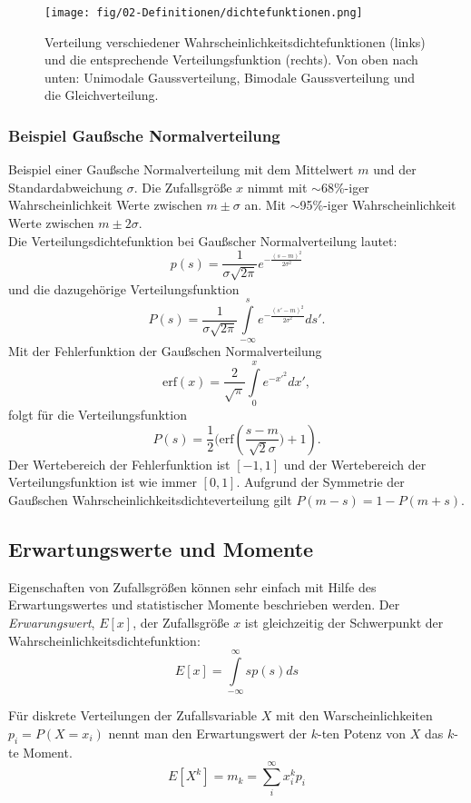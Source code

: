 \begin{figure}
\centering
\texttt{[image: fig/02-Definitionen/dichtefunktionen.png]}
\caption{Verteilung verschiedener Wahrscheinlichkeitsdichtefunktionen (links) und die entsprechende Verteilungsfunktion (rechts). Von oben nach unten: Unimodale Gaussverteilung, Bimodale Gaussverteilung und die Gleichverteilung.}
\label{fig:stoch_distribution}
\end{figure}

\subsubsection*{Beispiel Gaußsche Normalverteilung}
Beispiel einer Gaußsche Normalverteilung mit dem Mittelwert $m$ und der Standardabweichung $\sigma$. Die Zufallsgröße $x$ nimmt mit $\sim$68\%-iger Wahrscheinlichkeit Werte zwischen $m \pm \sigma$ an. Mit $\sim$95\%-iger Wahrscheinlichkeit Werte zwischen $m \pm 2\sigma$.\\
Die Verteilungsdichtefunktion bei Gaußscher Normalverteilung lautet:
\begin{equation}
p(s)=\frac{1}{\sigma \sqrt{2\pi}}e^{-\frac{(s-m)^2}{2\sigma^2}}
\end{equation}
und die dazugehörige Verteilungsfunktion
\[
P(s)=\frac{1}{\sigma \sqrt{2\pi}}\int\limits_{-\infty}^s e^{{-\frac{(s'-m)^2}{2\sigma^2}}}ds'.
\]
Mit der Fehlerfunktion der Gaußschen Normalverteilung
\[
\mbox{erf}(x)=\frac{2}{\sqrt{\pi}}\int\limits_0^x e^{-x'^2}dx',
\]
folgt für die Verteilungsfunktion
\[
P(s) = \frac{1}{2}(\mbox{erf}\left(\frac{s-m}{\sqrt{2} \sigma}) + 1\right).
\]
Der Wertebereich der Fehlerfunktion ist $[-1,1]$ und der Wertebereich der Verteilungsfunktion ist wie immer $[0,1]$. Aufgrund der Symmetrie der Gaußschen Wahrscheinlichkeitsdichteverteilung gilt $P(m-s) = 1 - P(m+s)$.

\subsection{Erwartungswerte und Momente}
Eigenschaften von Zufallsgrößen können sehr einfach mit Hilfe des Erwartungswertes und statistischer Momente beschrieben werden. Der \textit{Erwarungswert}, $E[x]$, der Zufallsgröße $x$ ist gleichzeitig der Schwerpunkt der Wahrscheinlichkeitsdichtefunktion:
\begin{equation}
E[x] = \int\limits_{-\infty}^{\infty}sp(s)ds
\end{equation}

Für diskrete Verteilungen der Zufallsvariable $X$ mit den Warscheinlichkeiten $p_i=P(X=x_i)$ nennt man den Erwartungswert der $k$-ten Potenz von $X$ das $k$-te Moment.
\begin{equation}
E[X^k]=m_k=\sum \limits_{i}^{\infty}x_i^k p_i
\end{equation}

